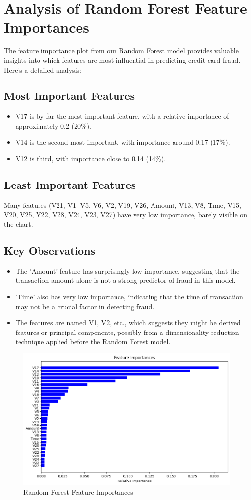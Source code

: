 \section{Analysis of Random Forest Feature Importances}

The feature importance plot from our Random Forest model provides valuable insights into which features are most influential in predicting credit card fraud. Here's a detailed analysis:

\subsection{Most Important Features}
\begin{itemize}
    \item V17 is by far the most important feature, with a relative importance of approximately 0.2 (20\%).
    \item V14 is the second most important, with importance around 0.17 (17\%).
    \item V12 is third, with importance close to 0.14 (14\%).
\end{itemize}

\subsection{Least Important Features}
Many features (V21, V1, V5, V6, V2, V19, V26, Amount, V13, V8, Time, V15, V20, V25, V22, V28, V24, V23, V27) have very low importance, barely visible on the chart.

\subsection{Key Observations}
\begin{itemize}
    \item The 'Amount' feature has surprisingly low importance, suggesting that the transaction amount alone is not a strong predictor of fraud in this model.
    \item 'Time' also has very low importance, indicating that the time of transaction may not be a crucial factor in detecting fraud.
    \item The features are named V1, V2, etc., which suggests they might be derived features or principal components, possibly from a dimensionality reduction technique applied before the Random Forest model.
\end{itemize}

\begin{figure}[h]
    \centering
    \includegraphics[width=0.8\linewidth]{Random Forest Feature Importances.png}
    \caption{Random Forest Feature Importances}
    \label{fig:Random Forest Feature Importances}
\end{figure}
